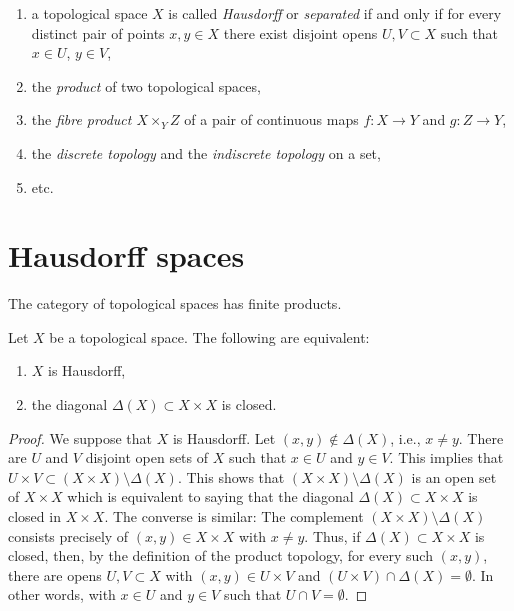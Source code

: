 \begin{enumerate}
\label{item-fundamental-system}
{\it $\{ E_i \}_{i \in I}$ is a fundamental system of neighbourhoods
of $x$ in $X$},
\item
\label{item-Hausdorff}
a topological space $X$ is called {\it Hausdorff} or {\it separated}
if and only if for every distinct pair of points $x, y \in X$ there exist
disjoint opens $U, V \subset X$ such that $x \in U$, $y \in V$,
\item the {\it product} of two topological spaces,
\label{item-product}
\item
\label{item-fibre-product}
the {\it fibre product $X \times_Y Z$} of a pair of continuous maps
$f : X \to Y$ and $g : Z \to Y$,
\item
\label{item-discrete-indiscrete}
the {\it discrete topology} and the {\it indiscrete topology} on a set,
\item etc.
\end{enumerate}



\section{Hausdorff spaces}
\label{section-Hausdorff}

\noindent
The category of topological spaces has finite products.

\begin{lemma}
\label{lemma-Hausdorff}
Let $X$ be a topological space. The following are equivalent:
\begin{enumerate}
\item $X$ is Hausdorff,
\item the diagonal $\Delta(X) \subset X \times X$ is closed.
\end{enumerate}
\end{lemma}

\begin{proof}
We suppose that $X$ is Hausdorff. Let $(x, y) \not \in \Delta(X)$, i.e.,
$x \neq y$. There are $U$ and $V$ disjoint open sets of $X$
such that $x \in U$ and $y \in V$. This implies that $U \times V \subset
(X \times X) \setminus \Delta(X) $. This shows that $ (X \times X) \setminus
\Delta(X)$ is an open set of $ X \times X$ which is equivalent to saying that
the diagonal $\Delta(X) \subset X \times X$ is closed in $X \times X$.
The converse is similar:
The complement $(X \times X) \setminus \Delta(X)$ consists
precisely of $(x, y) \in X\times X$ with $ x \neq y$. Thus, if $ \Delta(X)
\subset X \times X$ is closed, then, by the definition of the product topology,
for every such $ (x, y)$, there are opens $U, V \subset X$ with $(x, y) \in
U \times V$ and $(U \times V)\cap \Delta(X) = \emptyset$. In other words, with
$x \in U$ and $y \in V$ such that $U \cap V = \emptyset$.
\end{proof}

